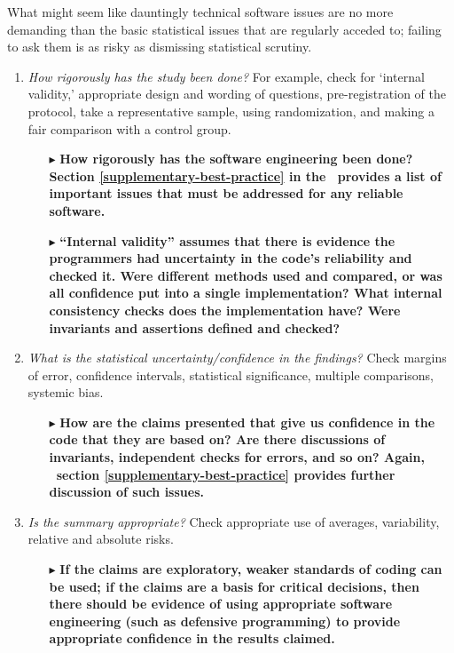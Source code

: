 \documentclass{article}
\begin{document}
What might seem like dauntingly technical software issues are no more demanding than the basic statistical issues that are regularly acceded to; failing to ask them is as risky as dismissing statistical scrutiny.

\def\questionsection#1{\changemysubsection{#1}}
\def\question#1{\item \emph{#1\/}}
\def\sequestion#1{\begin{itemize}\raggedright\item[$\blacktriangleright$] \textbf{#1}\end{itemize}}

\questionsection{How trustworthy are the numbers?}

\begin{enumerate}
\question{How rigorously has the study been done?} For example, check for `internal validity,' appropriate design and wording of questions, pre-registration of the protocol, take a representative sample, using randomization, and making a fair comparison with a control group.

\sequestion{How rigorously has the software engineering been done? Section \ref{supplementary-best-practice} in the \supplement\ provides a list of important issues that must be addressed for any reliable software.}

\sequestion{``Internal validity'' assumes that there is evidence the programmers had uncertainty in the code's reliability and checked it. Were different methods used and compared, or was all confidence put into a single implementation? What internal consistency checks does the implementation have? Were invariants and assertions defined and checked? }

\question{What is the statistical uncertainty/confidence in the findings?} Check margins of error, confidence intervals, statistical significance, multiple comparisons, systemic bias.

\sequestion{How are the claims presented that give us confidence in the code that they are based on? Are there discussions of invariants, independent checks for errors, and so on? Again, \supplement\ section \ref{supplementary-best-practice} provides further discussion of such issues.}


\question{Is the summary appropriate?} Check appropriate use of averages, variability, relative and absolute risks.

\sequestion{If the claims are exploratory, weaker standards of coding can be used; if the claims are a basis for critical decisions, then there should be evidence of using appropriate software engineering (such as defensive programming) to provide appropriate confidence in the results claimed.}
\setcounter{resumeCounter}{\value{enumi}}
\end{enumerate}
\end{document}
